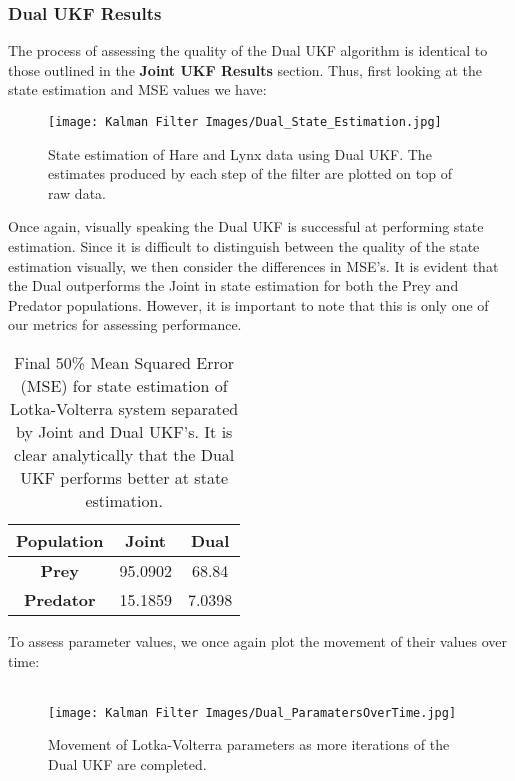                                 

\subsubsection{Dual UKF Results}
The process of assessing the quality of the Dual UKF algorithm is identical to those outlined in the \textbf{Joint UKF Results} section. Thus, first looking at the state estimation and MSE values we have:
\begin{figure}[H]
    \centering
    \texttt{[image: Kalman Filter Images/Dual\_State\_Estimation.jpg]}
    \caption{State estimation of Hare and Lynx data using Dual UKF. The estimates produced by each step of the filter are plotted on top of raw data.}
\end{figure}



Once again, visually speaking the Dual UKF is successful at performing state estimation. Since it is difficult to distinguish between the quality of the state estimation visually, we then consider the differences in MSE's. It is evident that the Dual outperforms the Joint in state estimation for both the Prey and Predator populations. However, it is important to note that this is only one of our metrics for assessing performance.

\begin{table}[H]
  \begin{center}
    \label{tab:table1}
    \begin{tabular}{c|c|c} %
      \textbf{Population} & \textbf{Joint} & \textbf{Dual} \\
      \hline
      \textbf{Prey} & 95.0902 & 68.84\\
      \textbf{Predator} & 15.1859 & 7.0398
    \end{tabular}
    \caption{Final 50\% Mean Squared Error (MSE) for state estimation of Lotka-Volterra system separated by Joint and Dual UKF's. It is clear analytically that the Dual UKF performs better at state estimation.}
  \end{center}
\end{table}



To assess parameter values, we once again plot the movement of their values over time:\\
\\
\begin{figure}[H]
    \centering
    \texttt{[image: Kalman Filter Images/Dual\_ParamatersOverTime.jpg]}
    \caption{Movement of Lotka-Volterra parameters as more iterations of the Dual UKF are completed.}
\end{figure}

